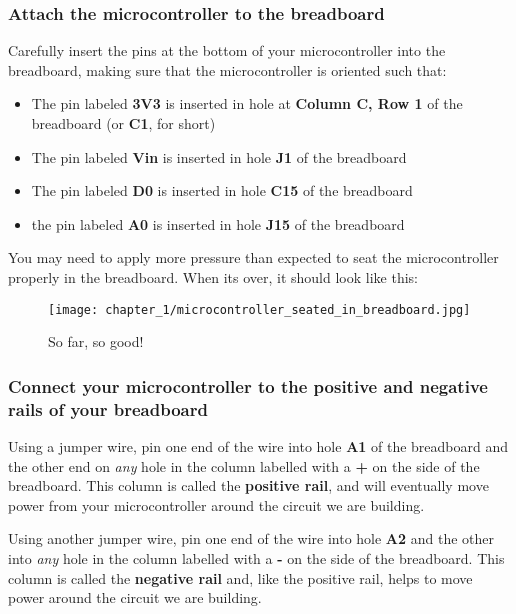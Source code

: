 \subsubsection{Attach the microcontroller to the breadboard}
Carefully insert the pins at the bottom of your microcontroller into the breadboard, making sure that the microcontroller is oriented such that:
\begin{itemize}
    \item The pin labeled \textbf{3V3} is inserted in hole at \textbf{Column C, Row 1} of the breadboard (or \textbf{C1}, for short)
    \item The pin labeled \textbf{Vin} is inserted in hole \textbf{J1} of the breadboard
    \item The pin labeled \textbf{D0} is inserted in hole \textbf{C15} of the breadboard
    \item the pin labeled \textbf{A0} is inserted in hole \textbf{J15} of the breadboard
\end{itemize}
You may need to apply more pressure than expected to seat the microcontroller properly in the breadboard. When its over, it should look like this:
\begin{figure}[h!]
    \centering
    \texttt{[image: chapter\_1/microcontroller\_seated\_in\_breadboard.jpg]}
    \caption{So far, so good!}
    \label{fig:microntroller+breadboard}
\end{figure}

\subsubsection{Connect your microcontroller to the positive and negative rails of your breadboard}
Using a jumper wire, pin one end of the wire into hole \textbf{A1} of the breadboard and the other end on \textit{any} hole in the column labelled with a \textbf{+} on the side of the breadboard. This column is called the \textbf{positive rail}, and will eventually move power from your microcontroller around the circuit we are building.

Using another jumper wire, pin one end of the wire into hole \textbf{A2} and the other into \textit{any} hole in the column labelled with a \textbf{-} on the side of the breadboard. This column is called the \textbf{negative rail} and, like the positive rail, helps to move power around the circuit we are building.


